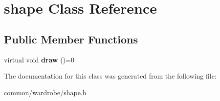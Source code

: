 \hypertarget{classshape}{\section{shape Class Reference}
\label{classshape}
}
\subsection*{Public Member Functions}
\begin{DoxyCompactItemize}
\item 
\hypertarget{classshape_a320badb93465566479ac24fa9dd371b6}{virtual void {\bfseries draw} ()=0}\label{classshape_a320badb93465566479ac24fa9dd371b6}

\end{DoxyCompactItemize}


The documentation for this class was generated from the following file\-:\begin{DoxyCompactItemize}
\item 
common/wardrobe/shape.\-h\end{DoxyCompactItemize}
